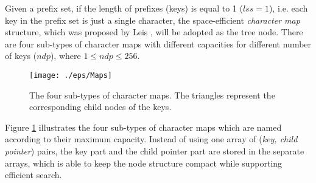 Given a prefix set, if the length of prefixes (keys) is equal to 1 ($lss=1$),
i.e. each key in the prefix set is just a single character, the
space-efficient \emph{character map} structure, which was proposed by
Leis \cite{Leis2013}, will be adopted as the tree node. There are four
sub-types of character maps with different capacities for different
number of keys ($ndp$), where $1 \leq ndp \leq 256$.

\begin{figure}[htbp]
  \centering
  \texttt{[image: ./eps/Maps]}
  \caption{The four sub-types of character maps. The triangles
    represent the corresponding child nodes of the keys.}
  \label{fig:character map}
\end{figure}

Figure \ref{fig:character map} illustrates the four sub-types of
character maps which are named according to their maximum
capacity. Instead of using one array of (\emph{key, child pointer})
pairs, the key part and the child pointer part are stored in the
separate arrays, which is able to keep the node structure compact
while supporting efficient search.

